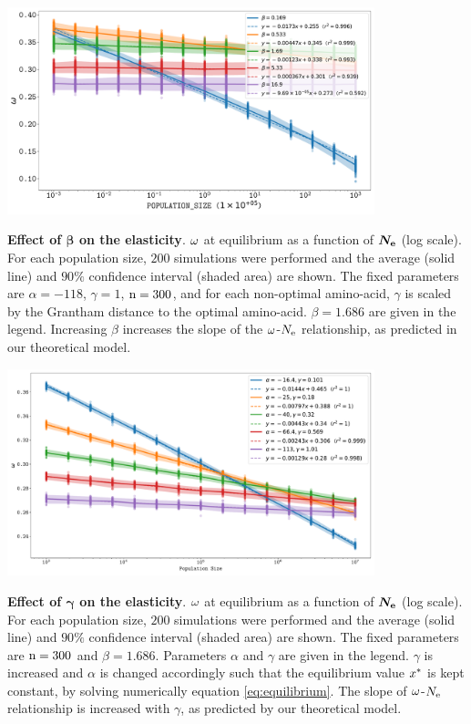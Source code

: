 \documentclass{article}
\begin{document}
\begin{center}
	\includegraphics[width=0.8\textwidth] {artworks/SimuStab-Grantham-Beta-Elasticity.pdf}
\end{center}
\textbf{Effect of $\bm{\beta}$ on the elasticity}.
$\omega$ at equilibrium as a function of $\bm{N_{\mathrm{e}}}$ (log scale).
For each population size, $200$ simulations were performed and the average (solid line) and $90\%$ confidence interval (shaded area) are shown.
The fixed parameters are $\alpha=-118$, $\gamma=1$, $\text{n}=300$, and for each non-optimal amino-acid, $\gamma$ is scaled by the Grantham distance to the optimal amino-acid. $\beta=1.686$ are given in the legend.
Increasing $\beta$ increases the slope of the $\omega$-$N_{\mathrm{e}}$ relationship, as predicted in our theoretical model.

\begin{center}
	\includegraphics[width=0.8\textwidth] {artworks/SimuStab-Alpha-Gamma-Elasticity.pdf}
\end{center}
\textbf{Effect of $\bm{\gamma}$ on the elasticity}.
$\omega$ at equilibrium as a function of $\bm{N_{\mathrm{e}}}$ (log scale).
For each population size, $200$ simulations were performed and the average (solid line) and $90\%$ confidence interval (shaded area) are shown.
The fixed parameters are $\text{n}=300$ and $\beta=1.686$. Parameters $\alpha$ and $\gamma$ are given in the legend.
$\gamma$ is increased and $\alpha$ is changed accordingly such that the equilibrium value $x^{*}$ is kept constant, by solving numerically equation \ref{eq:equilibrium}.
The slope of $\omega$-$N_{\mathrm{e}}$ relationship is increased with $\gamma$, as predicted by our theoretical model.
\end{document}
